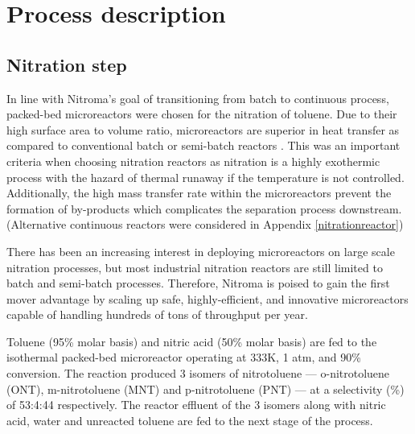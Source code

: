 \section{Process description}
\label{sec:process}
\subsection{Nitration step}
In line with Nitroma's goal of transitioning from batch to continuous process, packed-bed microreactors were chosen for the nitration of toluene. Due to their high surface area to volume ratio, microreactors are superior in heat transfer as compared to conventional batch or semi-batch reactors \cite{halder_nitration_2007}. This was an important criteria when choosing nitration reactors as nitration is a highly exothermic process with the hazard of thermal runaway if the temperature is not controlled. Additionally, the high mass transfer rate within the microreactors prevent the formation of by-products \cite{halder_nitration_2007} which complicates the separation process downstream.
(Alternative continuous reactors were considered in Appendix \ref{nitrationreactor})

There has been an increasing interest in deploying microreactors on large scale nitration processes, but most industrial nitration reactors are still limited to batch and semi-batch processes. Therefore, Nitroma is poised to gain the first mover advantage by scaling up safe, highly-efficient, and innovative microreactors capable of handling hundreds of tons of throughput per year.

Toluene (95\% molar basis) and nitric acid (50\% molar basis) are fed to the isothermal packed-bed microreactor operating at 333K, 1 atm, and 90\% conversion. The reaction produced 3 isomers of nitrotoluene --- o-nitrotoluene (ONT), m-nitrotoluene (MNT) and p-nitrotoluene (PNT) --- at a selectivity (\%) of 53:4:44 respectively. The reactor effluent of the 3 isomers along with nitric acid, water and unreacted toluene are fed to the next stage of the process.

